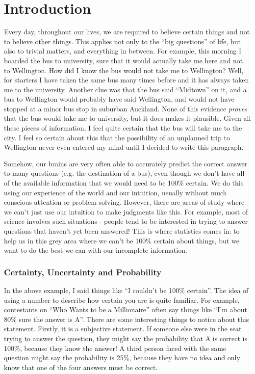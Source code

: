 \chapter{Introduction}
Every day, throughout our lives, we are required 
to believe certain things and not to believe other things. This applies not
only to the ``big questions'' of life, but also to trivial matters, and 
everything in between. For example, this morning I boarded the bus to 
university, sure that it would actually take me here and not to Wellington.
How did I know the bus would not take me to Wellington? Well, for starters
I have taken the same bus many times before and it has always taken me to the
university. Another clue was that the bus said ``Midtown'' on it, and a bus
to Wellington would probably have said Wellington, and would not have stopped
at a minor bus stop in suburban Auckland.
None of this evidence {\it proves} that the bus would take me to university,
but it does makes it plausible. Given all these pieces of information, I feel
quite certain that the bus will take me to the city. I feel so certain
about this that the possibility of an
unplanned trip to Wellington never even entered my mind until I decided to
write this paragraph.

Somehow, our brains are very often able to accurately predict the correct answer
to many questions (e.g. the destination of a bus), even though we don't have
all of the available information that we would need to be 100\% certain.
We do this using our experience of the world and our intuition, usually 
without much conscious attention or problem solving. However, there are areas
of study where we can't just use our intuition to make judgments like this.
For example, most of science involves such situations - people tend to be
interested in trying to answer questions that haven't yet been answered!
This is where statistics comes in: to help us in this grey area where we can't
be 100\% certain about things, but we want to do the best we can with our
incomplete information.

\subsection{Certainty, Uncertainty and Probability}
In the above example, I said things like ``I couldn't be 100\% certain''. The
idea of using a number to describe how certain you are is quite familiar.
For example, contestants on ``Who Wants to be a Millionaire'' often say things
like ``I'm about 80\% sure the answer is A''. There are some interesting
things to notice about this statement. Firstly, it is a subjective statement.
If someone else were in the seat trying to answer the question, they might say
the probability that A is correct is 100\%, because they know the answer!
A third person faced with the same question might say the probability is 25\%,
because they have no idea and only know that one of the four answers
must be correct.

